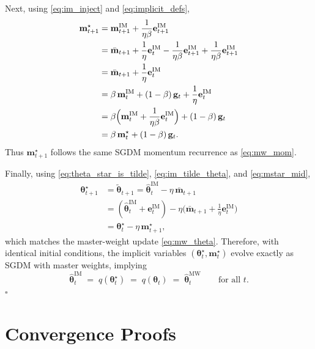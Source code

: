 \documentclass[11pt, a4paper, onecolumn, copyright, goog]{google}
\newcommand{\vect}[1]{\mathbf{#1}}
\newcommand{\vtheta}{\boldsymbol{\theta}}
\newcommand{\vg}{\vect{g}}
\newcommand{\vm}{\vect{m}}
\newcommand{\ve}{\vect{e}}
\newcommand{\qfn}{\textit{q}}
\theoremstyle{plain}
\theoremstyle{definition}
\theoremstyle{remark}
\begin{document}
Next, using \eqref{eq:im_inject} and \eqref{eq:implicit_defs},
\begin{align}
\vm^\star_{t+1}
&=
\vm^{\text{IM}}_{t+1} + \frac{1}{\eta\beta}\ve^{\text{IM}}_{t+1} \nonumber\\
&=
\bar{\vm}_{t+1} + \frac{1}{\eta}\ve^{\text{IM}}_{t}
- \frac{1}{\eta\beta}\ve^{\text{IM}}_{t+1}
+ \frac{1}{\eta\beta}\ve^{\text{IM}}_{t+1} \nonumber\\
&=
\bar{\vm}_{t+1} + \frac{1}{\eta}\ve^{\text{IM}}_{t} \nonumber\\
&=
\beta\,\vm^{\text{IM}}_t + (1-\beta)\,\vg_t + \frac{1}{\eta}\ve^{\text{IM}}_{t} \label{eq:mstar_mid}\\
&=
\beta\Bigl(\vm^{\text{IM}}_t + \frac{1}{\eta\beta}\ve^{\text{IM}}_{t}\Bigr) + (1-\beta)\,\vg_t \nonumber\\
&=
\beta\,\vm^\star_t + (1-\beta)\,\vg_t.
\label{eq:mstar_rec}
\end{align}
Thus $\vm^\star_{t+1}$ follows the same SGDM momentum recurrence as \eqref{eq:mw_mom}.

Finally, using \eqref{eq:theta_star_is_tilde}, \eqref{eq:im_tilde_theta}, and \eqref{eq:mstar_mid},
\begin{align}
\vtheta^\star_{t+1}
&=
\tilde{\vtheta}_{t+1}
=
\hat{\vtheta}^{\text{IM}}_t - \eta\,\bar{\vm}_{t+1} \nonumber\\
&=
(\hat{\vtheta}^{\text{IM}}_t + \ve^{\text{IM}}_{t})
- \eta\bigl(\bar{\vm}_{t+1} + \tfrac{1}{\eta}\ve^{\text{IM}}_{t}\bigr) \nonumber\\
&=
\vtheta^\star_t - \eta\,\vm^\star_{t+1},
\end{align}
which matches the master-weight update \eqref{eq:mw_theta}. Therefore, with identical initial conditions, the implicit variables $(\vtheta^\star_t,\vm^\star_t)$ evolve exactly as SGDM with master weights, implying
\[
\hat{\vtheta}^{\text{IM}}_t
\;=\;
\qfn(\vtheta^\star_t)
\;=\;
\qfn(\vtheta_t)
\;=\;
\hat{\vtheta}^{\text{MW}}_t
\qquad \text{for all } t.
\]
\hfill$\square$

\section{Convergence Proofs}
\label{apx:convergence-proofs}
\end{document}
